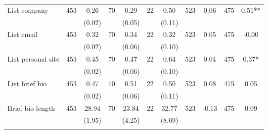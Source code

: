 \begin{tabular}{@{\extracolsep{5pt}}lcccccccccc}
List company   & 453    & 0.26    & 70    & 0.29    & 22    & 0.50    & 523    & 0.06    & 475    & 0.51**   \\
 &   & (0.02)  &   & (0.05)  &   & (0.11)  &   &  &   &  \\ [1ex]
List email   & 453    & 0.32    & 70    & 0.34    & 22    & 0.32    & 523    & 0.05    & 475    & -0.00   \\
 &   & (0.02)  &   & (0.06)  &   & (0.10)  &   &  &   &  \\ [1ex]
List personal site   & 453    & 0.45    & 70    & 0.47    & 22    & 0.64    & 523    & 0.04    & 475    & 0.37*   \\
 &   & (0.02)  &   & (0.06)  &   & (0.10)  &   &  &   &  \\ [1ex]
List brief bio   & 453    & 0.47    & 70    & 0.51    & 22    & 0.50    & 523    & 0.08    & 475    & 0.05   \\
 &   & (0.02)  &   & (0.06)  &   & (0.11)  &   &  &   &  \\ [1ex]
Brief bio length   & 453    & 28.94    & 70    & 23.84    & 22    & 32.77    & 523    & -0.13    & 475    & 0.09   \\
 &   & (1.95)  &   & (4.25)  &   & (8.69)  &   &  &   &  \\ [1ex]
\hline \hline \\[-1.8ex]

\end{tabular}
